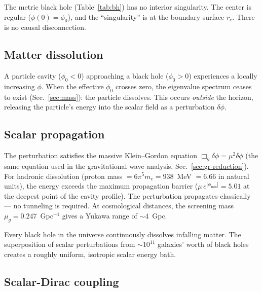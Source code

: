\documentclass[aps,prd,twocolumn,superscriptaddress,nofootinbib,longbibliography]{revtex4-2}
\newcommand{\phiz}{\phi_0}
\newcommand{\mug}{\mu_g}
\begin{document}
The metric black hole (Table~\ref{tab:bh}) has no interior
singularity.  The center is regular ($\phi(0) = \phiz$), and the
``singularity'' is at the boundary surface $r_c$.  There is no
causal disconnection.

\subsection{Matter dissolution}

A particle cavity ($\phiz < 0$) approaching a black hole
($\phiz > 0$) experiences a locally increasing $\phi$.  When the
effective $\phiz$ crosses zero, the eigenvalue spectrum ceases to
exist (Sec.~\ref{sec:mass}): the particle dissolves.  This occurs
\emph{outside} the horizon, releasing the particle's energy into the
scalar field as a perturbation $\delta\phi$.

\subsection{Scalar propagation}

The perturbation satisfies the massive Klein--Gordon equation
$\Box_g\delta\phi = \mu^2\delta\phi$ (the same equation used in the
gravitational wave analysis, Sec.~\ref{sec:gr-reduction}).  For
hadronic dissolution (proton mass $= 6\pi^5 m_e = 938$~MeV $= 6.66$
in natural units), the energy exceeds the maximum propagation barrier
($\mu\,e^{|\phi_{\min}|} = 5.01$ at the deepest point of the cavity
profile).  The perturbation propagates classically --- no tunneling is
required.  At cosmological distances, the screening mass
$\mug = 0.247$~Gpc$^{-1}$ gives a Yukawa range of $\sim 4$~Gpc.

Every black hole in the universe continuously dissolves infalling
matter.  The superposition of scalar perturbations from
$\sim 10^{11}$ galaxies' worth of black holes creates a roughly
uniform, isotropic scalar energy bath.

\subsection{Scalar-Dirac coupling}
\end{document}
